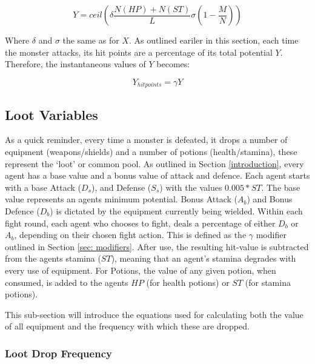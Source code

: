 \begin{equation}\label{eq:Y}
    Y = ceil \left(\delta \frac{N(HP)+N(ST)}{L} \sigma \left(1-\frac{M}{N} \right) \right)
\end{equation}

Where $\delta$ and $\sigma$ the same as for $X$. As outlined eariler in this section, each time the monster attacks, its hit points are a percentage of its total potential $Y$. Therefore, the instantaneous values of $Y$ becomes:

\begin{equation}
    Y_{hit points} = \gamma Y 
\end{equation}


\subsection{Loot Variables} \label{sec: loot}

As a quick reminder, every time a monster is defeated, it drops a number of equipment (weapons/shields) and a number of potions (health/stamina), these represent the `loot' or common pool. As outlined in Section \ref{introduction}, every agent has a base value and a bonus value of attack and defence. Each agent starts with a base Attack ($D_s$), and Defense ($S_s$) with the values $0.005*ST$. The base value represents an agents minimum potential.
Bonus Attack ($A_b$) and Bonus Defence ($D_b$) is dictated by the equipment currently being wielded. Within each fight round, each agent who chooses to fight, deals a percentage of either $D_b$ or $A_b$, depending on their chosen fight action. This is defined as the $\gamma$ modifier outlined in Section \ref{sec: modifiers}. After use, the resulting hit-value is subtracted from the agents stamina ($ST$), meaning that an agent's stamina degrades with every use of equipment. For Potions, the value of any given potion, when consumed, is added to the agents $HP$ (for health potions) or $ST$ (for stamina potions). 

This sub-section will introduce the equations used for calculating both the value of all equipment and the frequency with which these are dropped. 



\subsubsection{Loot Drop Frequency}

